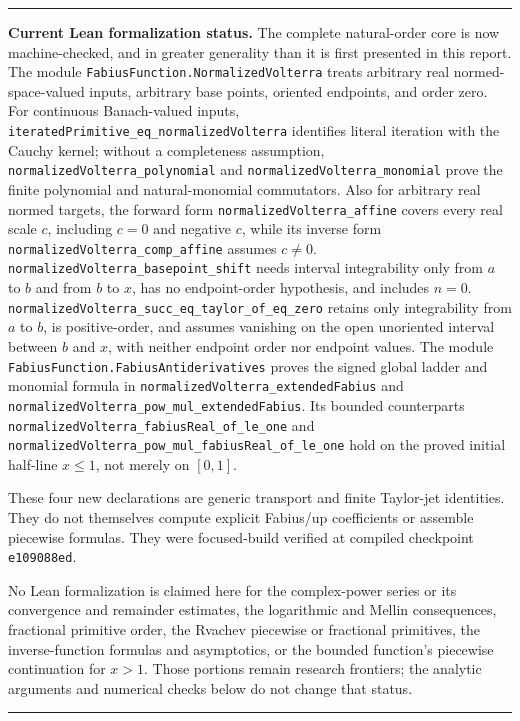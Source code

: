 \documentclass[11pt,oneside]{article}
\numberwithin{equation}{section}
\theoremstyle{definition}
\theoremstyle{remark}
\newcommand{\decl}[1]{\nolinkurl{#1}}
\newenvironment{boxedremark}{%
  \par\smallskip\noindent\begin{center}\begin{minipage}{0.94\textwidth}%
  \color{black}\hrule\vspace{0.6em}\small
}{%
  \vspace{0.6em}\hrule\end{minipage}\end{center}\smallskip
}
\begin{document}
\begin{boxedremark}
\textbf{Current Lean formalization status.}
The complete natural-order core is now machine-checked, and in greater
generality than it is first presented in this report.  The module
\decl{FabiusFunction.NormalizedVolterra} treats arbitrary real
normed-space-valued inputs, arbitrary base points, oriented endpoints, and
order zero.  For continuous Banach-valued inputs,
\decl{iteratedPrimitive_eq_normalizedVolterra} identifies literal iteration
with the Cauchy kernel; without a completeness assumption,
\decl{normalizedVolterra_polynomial} and
\decl{normalizedVolterra_monomial} prove the finite polynomial and
natural-monomial commutators.  Also for arbitrary real normed targets, the
forward form \decl{normalizedVolterra_affine} covers every real scale \(c\), including
\(c=0\) and negative \(c\), while its inverse form
\decl{normalizedVolterra_comp_affine} assumes \(c\ne0\).
\decl{normalizedVolterra_basepoint_shift} needs interval integrability only
from \(a\) to \(b\) and from \(b\) to \(x\), has no endpoint-order hypothesis,
and includes \(n=0\).
\decl{normalizedVolterra_succ_eq_taylor_of_eq_zero} retains only integrability
from \(a\) to \(b\), is positive-order, and assumes vanishing on
the open unoriented interval between \(b\) and \(x\), with neither endpoint
order nor endpoint values.  The
module \decl{FabiusFunction.FabiusAntiderivatives} proves the signed global
ladder and monomial formula in
\decl{normalizedVolterra_extendedFabius} and
\decl{normalizedVolterra_pow_mul_extendedFabius}.  Its bounded counterparts
\decl{normalizedVolterra_fabiusReal_of_le_one} and
\decl{normalizedVolterra_pow_mul_fabiusReal_of_le_one} hold on the proved
initial half-line $x\le1$, not merely on $[0,1]$.

These four new declarations are generic transport and finite Taylor-jet
identities.  They do not themselves compute explicit Fabius/up coefficients
or assemble piecewise formulas.  They were focused-build verified at compiled
checkpoint \texttt{e109088ed}.

No Lean formalization is claimed here for the complex-power series or its
convergence and remainder estimates, the logarithmic and Mellin consequences,
fractional primitive order, the Rvachev piecewise or fractional primitives,
the inverse-function formulas and asymptotics, or the bounded function's
piecewise continuation for $x>1$.  Those portions remain research frontiers;
the analytic arguments and numerical checks below do not change that status.
\end{boxedremark}
\end{document}
